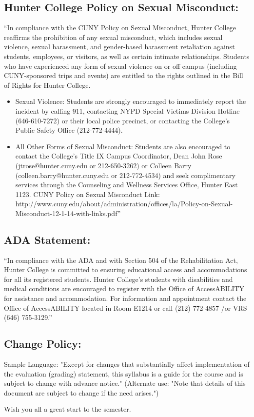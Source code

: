 \documentclass[a4paper]{article}
\begin{document}
\subsection{Hunter College Policy on Sexual Misconduct:}
“In compliance with the CUNY Policy on Sexual Misconduct, Hunter College reaffirms
the prohibition of any sexual misconduct, which includes sexual violence, sexual 
harassment, and gender-based harassment retaliation against students, employees,
or visitors, as well as certain intimate relationships. Students who have 
experienced any form of sexual violence on or off campus 
(including CUNY-sponsored trips and events) are entitled to the rights outlined 
in the Bill of Rights for Hunter College.
\begin{itemize}
\item Sexual Violence: Students are strongly encouraged to immediately report the
incident by calling 911, contacting NYPD Special Victims Division Hotline 
(646-610-7272) or their local police precinct, or contacting the College's Public 
Safety Office (212-772-4444).
\item All Other Forms of Sexual Misconduct: Students are also encouraged to contact
the College's Title IX Campus Coordinator, 
Dean John Rose (jtrose@hunter.cuny.edu or 212-650-3262) or 
Colleen Barry (colleen.barry@hunter.cuny.edu or 212-772-4534) and seek complimentary 
services through the Counseling and Wellness Services Office, Hunter East 1123. 
CUNY Policy on Sexual Misconduct 
Link: http://www.cuny.edu/about/administration/offices/la/Policy-on-Sexual-Misconduct-12-1-14-with-links.pdf”
\end{itemize}


\subsection{ADA Statement:}
“In compliance with the ADA and with Section 504 of the Rehabilitation Act, Hunter 
College is committed to ensuring educational access and accommodations for all its 
registered students. Hunter College's students with disabilities and medical 
conditions are encouraged to register with the Office of AccessABILITY for 
assistance and accommodation. For information and appointment contact the Office of 
AccessABILITY located in Room E1214 or call (212) 772-4857 /or VRS (646) 755-3129.”

\subsection{Change Policy:}
Sample Language: "Except for changes that substantially affect implementation of 
the evaluation (grading) statement, this syllabus is a guide for the course and
is subject to change with advance notice." (Alternate use: "Note that details of
this document are subject to change if the need arises.")

Wish you all a great start to the semester.
\end{document}
